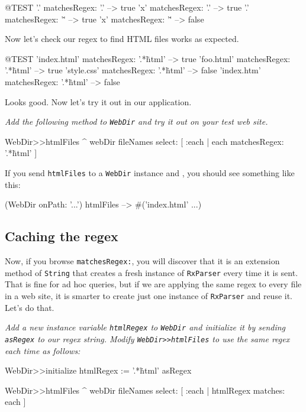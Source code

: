 \documentclass[10pt,twoside,chapterprefix=false]{scrbook}
\newcommand{\highlight}[1]{\textcolor{blue!65}{#1}}
\newcommand{\MarginLabel}[1]{%
	\marginnote{\textbf{#1}}}
\newcommand{\vartriangleout}{\ifthenelse{\isodd{\thepage}}{\vartriangleright}{\vartriangleleft}}
\renewcommand{\dothis}[1]{%
	\noindent\par\noindent
	{\reversemarginpar
		\marginnote{\fcolorbox{blue!65}{white}{\highlight{$\vartriangleout$}}}}
	\noindent\emph{#1}
	\nopagebreak}
\renewcommand{\ct}{\lstinline[mathescape=false,basicstyle={\sffamily\upshape}]}
\begin{document}
\begin{ToSh-code}{@TEST}
'.' matchesRegex: '.'   --> true
'x' matchesRegex: '.'  --> true
'.' matchesRegex: '\.'  --> true
'x' matchesRegex: '\.' --> false
\end{ToSh-code}

Now let's check our regex to find HTML files works as expected.

\begin{ToSh-code}{@TEST}
'index.html' matchesRegex: '.*\.html' --> true
'foo.html' matchesRegex: '.*\.html'    --> true
'style.css' matchesRegex: '.*\.html'   --> false
'index.htm' matchesRegex: '.*\.html' --> false
\end{ToSh-code}

Looks good. Now let's try it out in our application.

\dothis{Add the following method to \ct{WebDir} and try it out on your test web site.}

\begin{ToSh-code}{}
WebDir>>htmlFiles
	^ webDir fileNames select: [ :each | each matchesRegex: '.*\.html' ]
\end{ToSh-code}

If you send \ct{htmlFiles} to a \ct{WebDir} instance and , you should see something like this:

\begin{ToSh-code}{}
(WebDir onPath: '...') htmlFiles --> #('index.html' ...)
\end{ToSh-code}

\subsection{Caching the regex}

Now, if you browse \ct{matchesRegex:}, you will discover that it is an
extension method of \ct{String} that creates a fresh instance of
\ct{RxParser} every time it is sent.  That is fine for ad hoc queries,
but if we are applying the same regex to every file in a web site, it is
smarter to create just one instance of \ct{RxParser} and reuse it. Let's
do that.

\dothis{Add a new instance variable \ct{htmlRegex} to \ct{WebDir} and
initialize it by sending \ct{asRegex} to our regex string.  Modify
\ct{WebDir>>htmlFiles} to use the same regex each time as follows:}

\begin{ToSh-code}{}
WebDir>>initialize
	htmlRegex := '.*\.html' asRegex

WebDir>>htmlFiles
	^ webDir fileNames select: [ :each | htmlRegex matches: each ]
\end{ToSh-code}
\end{document}

